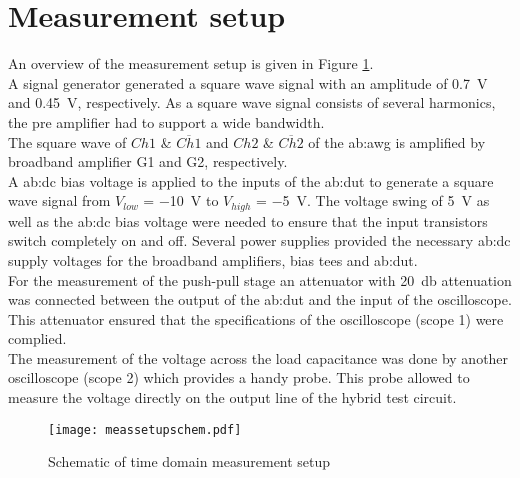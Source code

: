 \section{Measurement setup}
An overview of the measurement setup is given in Figure \ref{fig:SchematicMeasSetup}.\\
A signal generator generated a square wave signal with an amplitude of \SI{0.7}{\volt} and \SI{0.45}{\volt}, respectively.
As a square wave signal consists of several harmonics, the pre amplifier had to support a wide bandwidth.\\
The square wave of $Ch1$ \& $\overline{Ch1}$ and $Ch2$ \& $\overline{Ch2}$ of the \gls{ab:awg} \cite{Keysight2015} is amplified by broadband amplifier G1 and G2, respectively.\\
A \gls{ab:dc} bias voltage is applied to the inputs of the \gls{ab:dut} to generate a square wave signal from $V_{low}$ = \SI{-10}{\volt} to $V_{high}$ = \SI{-5}{\volt}.
The voltage swing of \SI{5}{\volt} as well as the \gls{ab:dc} bias voltage were needed to ensure that the input transistors switch completely on and off.
Several power supplies provided the necessary \gls{ab:dc} supply voltages for the broadband amplifiers, bias tees and \gls{ab:dut}.\\
For the measurement of the push-pull stage an attenuator with \SI{20}{\decibel} attenuation was connected between the output of the \gls{ab:dut} and the input of the oscilloscope.
This attenuator ensured that the specifications of the oscilloscope (scope 1) were complied.\\
The measurement of the voltage across the load capacitance was done by another oscilloscope (scope 2) which provides a handy probe.
This probe allowed to measure the voltage directly on the output line of the hybrid test circuit.


\begin{figure}[htb!]
	\centering
  \texttt{[image: meassetupschem.pdf]}
	\caption{Schematic of time domain measurement setup}
	\label{fig:SchematicMeasSetup}
\end{figure}

